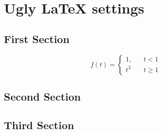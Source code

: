 \documentclass[12pt]{article}
\begin{document}
\section{Ugly \LaTeX{}  settings}
 
\lipsum[1-2] 

 
 \lipsum[3-5] 
 
\subsection{First Section}

\lipsum[1]
\begin{equation}
f(t)=\left\{ \begin{array}{ll}
1,~~~~ & t< 1 \\
t^2 & t\geq 1

\end{array}\right.
\end{equation}
 
\lipsum[3-7]

\subsection{Second Section}

\lipsum[4-8]

\subsection{Third Section}

\lipsum[6-10]
 
\end{document}
